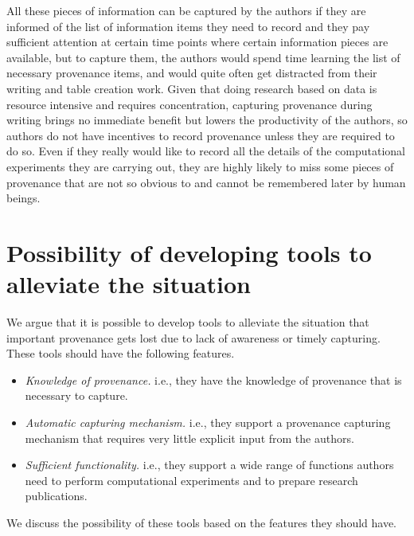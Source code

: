 All these pieces of information can be captured by the authors if they are informed of the list of 
information items they need to record and they pay sufficient attention at certain time points where 
certain information pieces are available, but to capture them, the authors would spend time learning the list of necessary provenance items, and would quite often get 
distracted from their writing and table creation work. Given that doing research based on data is 
resource intensive and requires concentration, capturing provenance during writing brings no 
immediate benefit but lowers the productivity of the authors, so authors do not have incentives to 
record provenance unless they are required to do so. Even if they really would like to record all the 
details of the computational experiments they are carrying out, they are highly likely to miss some 
pieces of provenance that are not so obvious to and cannot be remembered later by human beings. 


\section{Possibility of developing tools to alleviate the situation}
\label{sec:possibility}
We argue that it is possible to develop tools to alleviate the situation that important provenance gets lost due to lack of awareness or timely capturing. These tools should have the following features.
\begin{itemize}
\item \emph{Knowledge of provenance.} i.e., they have the knowledge of provenance that is necessary to capture.
\item \emph{Automatic capturing mechanism.} i.e., they support a provenance capturing mechanism that requires very little explicit input from the authors.
\item \emph{Sufficient functionality.} i.e., they support a wide range of functions authors need to perform computational experiments and to prepare research publications.
\end{itemize}
We discuss the possibility of these tools based on the features they should have.

